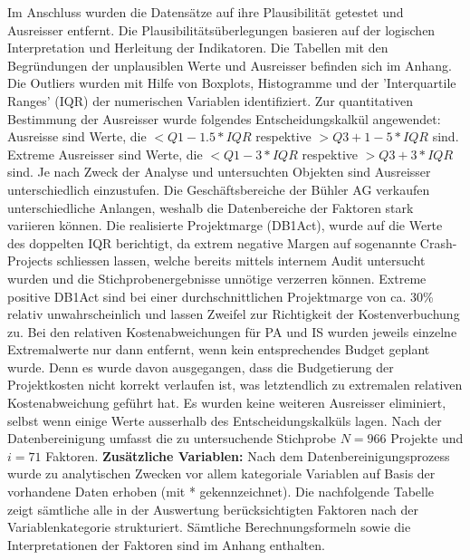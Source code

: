 \newline
Im Anschluss wurden die Datensätze auf ihre Plausibilität getestet und Ausreisser entfernt. Die Plausibilitätsüberlegungen basieren auf der logischen Interpretation und Herleitung der Indikatoren. Die Tabellen mit den Begründungen der unplausiblen Werte und Ausreisser befinden sich im Anhang. Die Outliers wurden mit Hilfe von Boxplots, Histogramme und der 'Interquartile Ranges' (IQR) der numerischen Variablen identifiziert. Zur quantitativen Bestimmung der Ausreisser wurde folgendes Entscheidungskalkül angewendet:
\newline\newline
Ausreisse sind Werte, die $< Q1 - 1.5 * IQR$ respektive $ > Q3 + 1-5 * IQR$ sind.
\newline
Extreme Ausreisser sind Werte, die $< Q1 - 3 * IQR$ respektive $> Q3 + 3 * IQR$ sind.
\newline\newline
Je nach Zweck der Analyse und untersuchten Objekten sind Ausreisser unterschiedlich einzustufen. Die Geschäftsbereiche der Bühler AG verkaufen unterschiedliche Anlangen, weshalb die Datenbereiche der Faktoren stark variieren können. Die realisierte Projektmarge (DB1Act), wurde auf die Werte des doppelten IQR berichtigt, da extrem negative Margen auf sogenannte Crash-Projects schliessen lassen, welche bereits mittels internem Audit untersucht wurden und die Stichprobenergebnisse unnötige verzerren können. Extreme positive DB1Act sind bei einer durchschnittlichen Projektmarge von ca. 30\% relativ unwahrscheinlich und lassen Zweifel zur Richtigkeit der Kostenverbuchung zu. Bei den relativen Kostenabweichungen für PA und IS wurden jeweils einzelne Extremalwerte nur dann entfernt, wenn kein entsprechendes Budget geplant wurde. Denn es wurde davon ausgegangen, dass die Budgetierung der Projektkosten nicht korrekt verlaufen ist, was letztendlich zu extremalen relativen Kostenabweichung geführt hat. Es wurden keine weiteren Ausreisser eliminiert, selbst wenn einige Werte ausserhalb des Entscheidungskalküls lagen. Nach der Datenbereinigung umfasst die zu untersuchende Stichprobe $N = 966$ Projekte und $ i = 71$ Faktoren.
\newline\newline
\textbf{Zusätzliche Variablen:} Nach dem Datenbereinigungsprozess wurde zu analytischen Zwecken vor allem kategoriale Variablen auf Basis der vorhandene Daten erhoben (mit * gekennzeichnet). Die nachfolgende Tabelle zeigt sämtliche alle in der Auswertung berücksichtigten Faktoren nach der Variablenkategorie strukturiert. Sämtliche Berechnungsformeln sowie die Interpretationen der Faktoren sind im Anhang enthalten.
